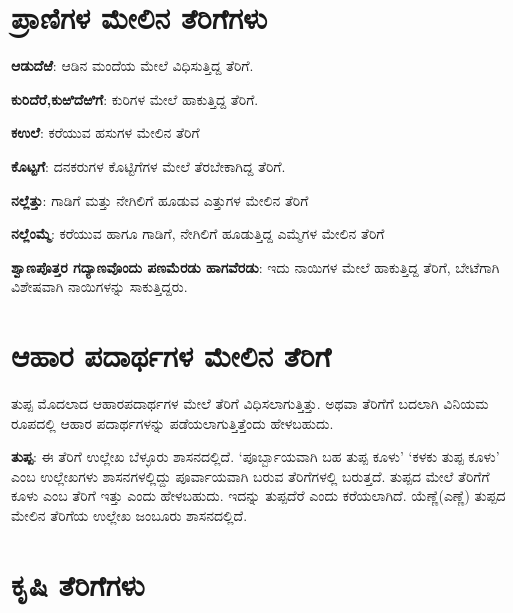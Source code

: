 \section{ಪ್ರಾಣಿಗಳ ಮೇಲಿನ ತೆರಿಗೆಗಳು}

\textbf{ಆಡುದೆಱೆ}: ಆಡಿನ ಮಂದೆಯ ಮೇಲೆ ವಿಧಿಸುತ್ತಿದ್ದ ತೆರಿಗೆ.

\textbf{ಕುರಿದೆರೆ,}\textbf{ಕುಱಿದೆಱಿಗೆ}: ಕುರಿಗಳ ಮೇಲೆ ಹಾಕುತ್ತಿದ್ದ ತೆರಿಗೆ.

\textbf{ಕಉಲೆ}: ಕರೆಯುವ ಹಸುಗಳ ಮೇಲಿನ ತೆರಿಗೆ

\textbf{ಕೊಟ್ಟಗೆ}: ದನಕರುಗಳ ಕೊಟ್ಟಿಗೆಗಳ ಮೇಲೆ ತೆರಬೇಕಾಗಿದ್ದ ತೆರಿಗೆ.

\textbf{ನಲ್ಲೆತ್ತು}: ಗಾಡಿಗೆ ಮತ್ತು ನೇಗಿಲಿಗೆ ಹೂಡುವ ಎತ್ತುಗಳ ಮೇಲಿನ ತೆರಿಗೆ

\textbf{ನಲ್ಲೆಂಮ್ಮೆ}: ಕರೆಯುವ ಹಾಗೂ ಗಾಡಿಗೆ, ನೇಗಿಲಿಗೆ ಹೂಡುತ್ತಿದ್ದ ಎಮ್ಮೆಗಳ ಮೇಲಿನ ತೆರಿಗೆ

\textbf{ಶ್ವಾಣಪೊತ್ತರ ಗದ್ಯಾಣವೊಂದು ಪಣಮೆರಡು ಹಾಗವೆರಡು}: ಇದು ನಾಯಿಗಳ ಮೇಲೆ ಹಾಕುತ್ತಿದ್ದ ತೆರಿಗೆ, ಬೇಟೆಗಾಗಿ ವಿಶೇಷವಾಗಿ ನಾಯಿಗಳನ್ನು ಸಾಕುತ್ತಿದ್ದರು.


\section{ಆಹಾರ ಪದಾರ್ಥಗಳ ಮೇಲಿನ ತೆರಿಗೆ}

ತುಪ್ಪ ಮೊದಲಾದ ಆಹಾರಪದಾರ್ಥಗಳ ಮೇಲೆ ತೆರಿಗೆ ವಿಧಿಸಲಾಗುತ್ತಿತ್ತು. ಅಥವಾ ತೆರಿಗೆಗೆ ಬದಲಾಗಿ ವಿನಿಯಮ ರೂಪದಲ್ಲಿ ಆಹಾರ ಪದಾರ್ಥಗಳನ್ನು ಪಡೆಯಲಾಗುತ್ತಿತ್ತೆಂದು ಹೇಳಬಹುದು.

\textbf{ತುಪ್ಪ}: ಈ ತೆರಿಗೆ ಉಲ್ಲೇಖ ಬೆಳ್ಳೂರು ಶಾಸನದಲ್ಲಿದೆ. ‘ಪೂರ್ಬ್ಬಾಯವಾಗಿ ಬಹ ತುಪ್ಪ ಕೂಳು’ ‘ಕಳಕು ತುಪ್ಪ ಕೂಳು’ ಎಂಬ ಉಲ್ಲೇಖಗಳು ಶಾಸನಗಳಲ್ಲಿದ್ದು ಪೂರ್ವಾಯವಾಗಿ ಬರುವ ತೆರಿಗೆಗಳಲ್ಲಿ ಬರುತ್ತದೆ. ತುಪ್ಪದ ಮೇಲೆ ತೆರಿಗೆಗೆ ಕೂಳು ಎಂಬ ತೆರಿಗೆ ಇತ್ತು ಎಂದು ಹೇಳಬಹುದು. ಇದನ್ನು ತುಪ್ಪದೆರೆ ಎಂದು ಕರೆಯಲಾಗಿದೆ. ಯೆಣ್ಣೆ(ಎಣ್ಣೆ) ತುಪ್ಪದ ಮೇಲಿನ ತೆರಿಗೆಯ ಉಲ್ಲೇಖ ಜಂಬೂರು ಶಾಸನದಲ್ಲಿದೆ.


\section{ಕೃಷಿ ತೆರಿಗೆಗಳು}


